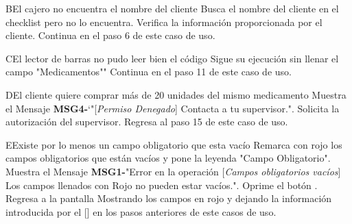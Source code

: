		\begin{UCtrayectoriaA}{B}{El cajero no encuentra el nombre del cliente}
			\UCpaso [\UCactor] Busca el nombre del cliente en el checklist pero no lo encuentra. 
			\UCpaso [\UCactor] Verifica la información proporcionada por el cliente.
			\UCpaso [\UCactor] Continua en el paso 6 de este caso de uso.			
		\end{UCtrayectoriaA}
		\begin{UCtrayectoriaA}{C}{El lector de barras no pudo leer bien el código}
			\UCpaso Sigue su ejecución sin llenar el campo "Medicamentos""
			\UCpaso Continua en el paso 11 de este caso de uso.	
		\end{UCtrayectoriaA}
		\begin{UCtrayectoriaA}{D}{El cliente quiere comprar más de 20 unidades del mismo medicamento}
			\UCpaso Muestra el Mensaje {\bf MSG4-}`"[{\em Permiso Denegado}] Contacta a tu supervisor.".
			\UCpaso [\UCactor] Solicita la autorización del supervisor.
			\UCpaso Regresa al paso 15 de este caso de uso.
		\end{UCtrayectoriaA}		
			\begin{UCtrayectoriaA}{E}{Existe por lo menos un campo obligatorio que esta vacío}
			\UCpaso Remarca con rojo los campos obligatorios que están vacíos y pone la leyenda "Campo Obligatorio".
			\UCpaso Muestra el Mensaje {\bf MSG1-}"Error en la operación [{\em Campos obligatorios vacíos}] Los campos llenados con Rojo no pueden estar vacíos.".
			\UCpaso[\UCactor] Oprime el botón .
			\UCpaso Regresa a la pantalla  Mostrando los campos en rojo y dejando la información introducida por el [\UCactor] en los pasos anteriores de este casos de uso.
		\end{UCtrayectoriaA}
